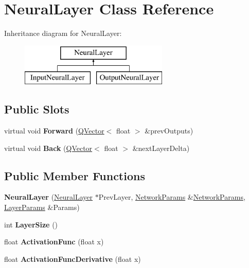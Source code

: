 \hypertarget{class_neural_layer}{}\section{Neural\+Layer Class Reference}
\label{class_neural_layer}
Inheritance diagram for Neural\+Layer\+:\begin{figure}[H]
\begin{center}
\leavevmode
\includegraphics[height=2.000000cm]{class_neural_layer}
\end{center}
\end{figure}
\subsection*{Public Slots}
\begin{DoxyCompactItemize}
\item 
\mbox{\label{class_neural_layer_ab314d73699d84855b5611ffd9b526da2}} 
virtual void {\bfseries Forward} (\hyperlink{class_q_vector}{Q\+Vector}$<$ float $>$ \&prev\+Outputs)
\item 
\mbox{\label{class_neural_layer_a05fc717e06e6f287d5b1e8ea69f56727}} 
virtual void {\bfseries Back} (\hyperlink{class_q_vector}{Q\+Vector}$<$ float $>$ \&next\+Layer\+Delta)
\end{DoxyCompactItemize}
\subsection*{Public Member Functions}
\begin{DoxyCompactItemize}
\item 
\mbox{\label{class_neural_layer_a33736379abd178ba2ab394ad39a2e284}} 
{\bfseries Neural\+Layer} (\hyperlink{class_neural_layer}{Neural\+Layer} $\ast$Prev\+Layer, \hyperlink{struct_perceptron_1_1_network_params}{Network\+Params} \&\hyperlink{struct_perceptron_1_1_network_params}{Network\+Params}, \hyperlink{struct_perceptron_1_1_layer_params}{Layer\+Params} \&Params)
\item 
\mbox{\label{class_neural_layer_a4d000e0a192aa8f22f04762b7d208357}} 
int {\bfseries Layer\+Size} ()
\item 
\mbox{\label{class_neural_layer_a3e565a98ae1d7353795575f575de1830}} 
float {\bfseries Activation\+Func} (float x)
\item 
\mbox{\label{class_neural_layer_af2c164486c9757912f72ff06ab976d39}} 
float {\bfseries Activation\+Func\+Derivative} (float x)
\end{DoxyCompactItemize}
